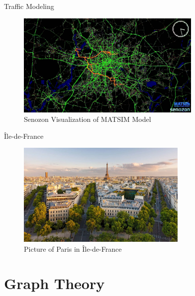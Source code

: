 \documentclass[10pt, aspectratio=169]{beamer}
\begin{document}
    \begin{frame}[fragile]{Traffic Modeling}
        \begin{center}
            \begin{figure}
                \centering
                \includegraphics[height=5cm, keepaspectratio]{images/senozon.jpeg}
                \caption{Senozon Visualization of MATSIM Model \cite{senozon}}
            \end{figure}
        \end{center}
    \end{frame}
    
    \begin{frame}{Île-de-France}
        \begin{center}
            \begin{figure}
                \centering
                \includegraphics[height=5cm, keepaspectratio]{images/iledefrance.png}
                \caption{Picture of Paris in Île-de-France \cite{iledefrance}}
            \end{figure}
        \end{center}
    \end{frame}
    
    \section{Graph Theory}
    
\end{document}
